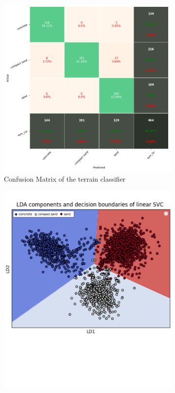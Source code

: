 \documentclass{article}
\begin{document}
\begin{figure}[!htb]
    \centering
    \begin{subfigure}[b]{0.55\textwidth}
        \includegraphics[trim={0 0 0 0},clip,width=\textwidth]{../figures/confusionmatrix_Train.png}
        \caption{Confusion Matrix of the terrain classifier}
    \end{subfigure}
    \begin{subfigure}[b]{0.44\textwidth}
        \includegraphics[width=\textwidth]{../figures/boundary_LDA_prevTesting_all_sand_concrete_compactsand_v2.png}

\end{subfigure}
\end{figure}
\end{document}
